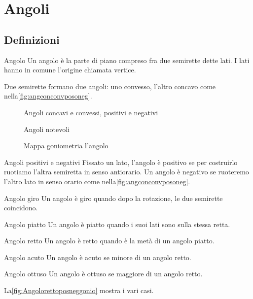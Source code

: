 \chapter{Angoli}
\label{cha:angoli}
\section{Definizioni}
\begin{definizionet}{Angolo}{}
	Un angolo è la parte di piano compreso fra due semirette dette lati. I lati hanno in comune l'origine chiamata vertice.
\end{definizionet}

Due semirette formano due angoli: uno convesso, l'altro concavo come nella\nobs\vref{fig:angconconvposoneg}. 
\begin{figure} %
	\centering
	
	\caption{Angoli concavi e convessi, positivi e negativi}\label{fig:angconconvposoneg}
\end{figure}
\begin{figure} %
	\centering
	
	\caption{Angoli notevoli}\label{fig:Angolorettoposneggonio}
\end{figure}
\begin{figure}
	
	\caption{Mappa goniometria l'angolo}\label{fig:MappaGonometria1}
\end{figure}
\begin{definizionet}{Angoli positivi e negativi}{}
	Fissato un lato, l'angolo è positivo se per costruirlo ruotiamo l'altra semiretta in senso antiorario. Un angolo è negativo se ruoteremo l'altro lato in senso orario come nella\nobs\vref{fig:angconconvposoneg}. 
\end{definizionet}
\begin{definizionet}{Angolo giro}{}
	Un angolo è giro quando dopo la rotazione, le due semirette coincidono. 
\end{definizionet}
\begin{definizionet}{Angolo piatto}{}
	Un angolo è piatto quando i suoi lati sono sulla stessa retta.
\end{definizionet}
\begin{definizionet}{Angolo retto}{}
	Un angolo è retto quando è la metà di un angolo piatto. 
\end{definizionet}
\begin{definizionet}{Angolo acuto}{}
	Un angolo è acuto se minore di un angolo retto.
\end{definizionet}
\begin{definizionet}{Angolo ottuso}{}
	Un angolo è ottuso se maggiore di un angolo retto.
\end{definizionet}
La\nobs\vref{fig:Angolorettoposneggonio} mostra i vari casi.
